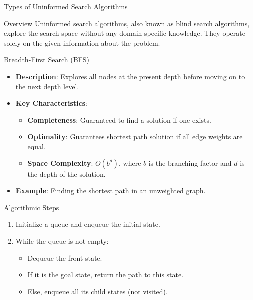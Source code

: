\documentclass[aspectratio=169]{beamer}
\begin{document}
\begin{frame}[fragile]{Types of Uninformed Search Algorithms}
    \begin{block}{Overview}
        Uninformed search algorithms, also known as blind search algorithms, explore the search space without any domain-specific knowledge. 
        They operate solely on the given information about the problem.
    \end{block}
\end{frame}

\begin{frame}[fragile]{Breadth-First Search (BFS)}
    \begin{itemize}
        \item \textbf{Description}: Explores all nodes at the present depth before moving on to the next depth level.
        \item \textbf{Key Characteristics}:
            \begin{itemize}
                \item \textbf{Completeness}: Guaranteed to find a solution if one exists.
                \item \textbf{Optimality}: Guarantees shortest path solution if all edge weights are equal.
                \item \textbf{Space Complexity}: $O(b^d)$, where $b$ is the branching factor and $d$ is the depth of the solution.
            \end{itemize}
        \item \textbf{Example}: Finding the shortest path in an unweighted graph.
    \end{itemize}
    \begin{block}{Algorithmic Steps}
        \begin{enumerate}
            \item Initialize a queue and enqueue the initial state.
            \item While the queue is not empty:
                \begin{itemize}
                    \item Dequeue the front state.
                    \item If it is the goal state, return the path to this state.
                    \item Else, enqueue all its child states (not visited).
                \end{itemize}
        \end{enumerate}
    \end{block}
\end{frame}
\end{document}
